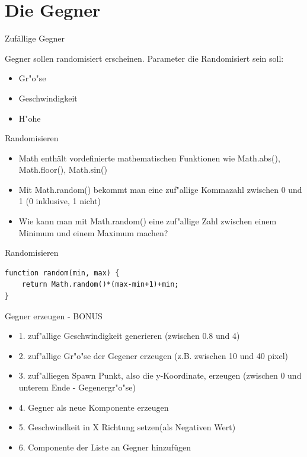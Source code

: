\documentclass[18pt]{beamer}
\begin{document}
\section{Die Gegner}
\begin{frame}{Zufällige Gegner}

Gegner sollen randomisiert erscheinen.
Parameter die Randomisiert sein soll:
\begin{itemize}
	\item Gr"o"se
	\item Geschwindigkeit
	\item H"ohe
\end{itemize}
\end{frame}

\begin{frame}{Randomisieren}
\begin{itemize}
	\item Math enthält vordefinierte mathematischen Funktionen wie Math.abs(), Math.floor(), Math.sin()
	\item Mit Math.random() bekommt man eine zuf"allige Kommazahl zwischen 0 und 1 (0 inklusive, 1 nicht)
	\item Wie kann man mit Math.random() eine zuf"allige Zahl zwischen einem Minimum und einem Maximum machen?
	
\end{itemize}
\end{frame}

\begin{frame}[fragile]{Randomisieren}
\begin{lstlisting}
function random(min, max) {
	return Math.random()*(max-min+1)+min;
}
\end{lstlisting}
\end{frame}

\begin{frame}[fragile]{Gegner erzeugen - BONUS}
\begin{itemize}
	\item 1. zuf"allige Geschwindigkeit generieren (zwischen 0.8 und 4)
	 \item 2. zuf"allige Gr"o"se der Gegener erzeugen (z.B. zwischen 10 und 40 pixel)  
	\item 3. zuf"alliegen Spawn Punkt, also die y-Koordinate, erzeugen (zwischen 0 und unterem Ende - Gegenergr"o"se) 
	\item 4. Gegner als neue Komponente erzeugen
	\item 5. Geschwindkeit in X Richtung setzen(als Negativen Wert)
	\item 6. Componente der Liste an Gegner hinzufügen	
\end{itemize}
\end{frame}
\end{document}
